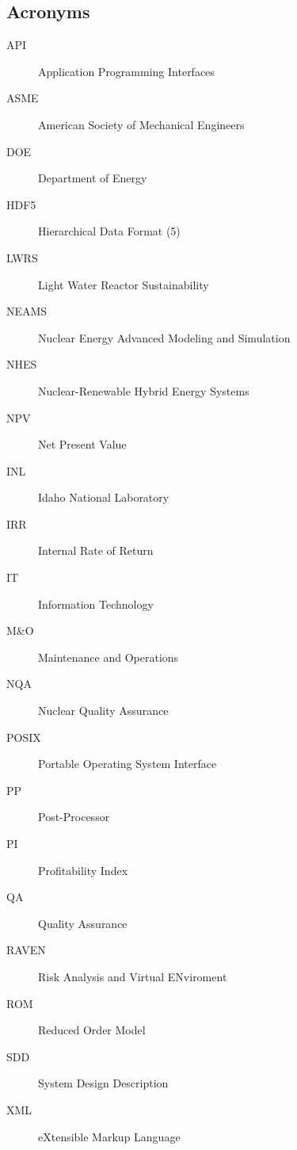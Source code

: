 \subsection{Acronyms}
\begin{description}
\item[API] Application Programming Interfaces
\item[ASME] American Society of Mechanical Engineers
\item[DOE] Department of Energy
\item[HDF5] Hierarchical Data Format (5)
\item[LWRS] Light Water Reactor Sustainability
\item[NEAMS] Nuclear Energy Advanced Modeling and Simulation
\item[NHES] Nuclear-Renewable Hybrid Energy Systems 
\item[NPV] Net Present Value
\item[INL] Idaho National Laboratory
\item[IRR] Internal Rate of Return
\item[IT] Information Technology
\item[M\&O] Maintenance and Operations
\item[NQA] Nuclear Quality Assurance
\item[POSIX]  Portable Operating System Interface
\item[PP]  Post-Processor
\item[PI] Profitability Index
\item[QA] Quality Assurance
\item[RAVEN] Risk Analysis and Virtual ENviroment
\item[ROM] Reduced Order Model
\item[SDD] System Design Description
\item[XML] eXtensible Markup Language 
\end{description}
